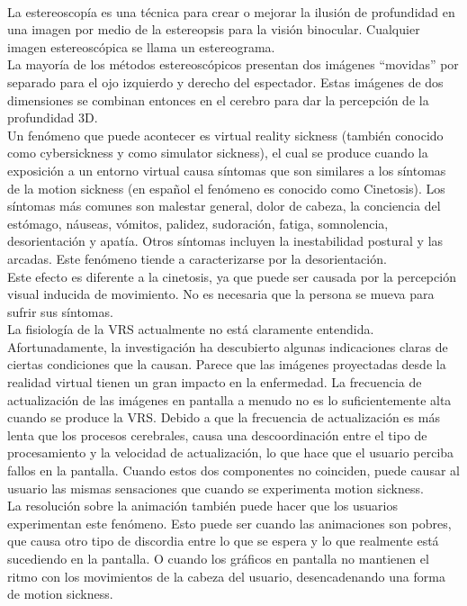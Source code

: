 \documentclass[12pt]{article}
\begin{document}
\\La estereoscopía es una técnica para crear o mejorar la ilusión de profundidad en una imagen por medio de la estereopsis para la visión binocular. Cualquier imagen estereoscópica se llama un estereograma. 
\\La mayoría de los métodos estereoscópicos presentan  dos imágenes “movidas” por separado para el ojo izquierdo y derecho del espectador. Estas imágenes de dos dimensiones se combinan entonces en el cerebro para dar la percepción de la profundidad 3D.
\\Un fenómeno que puede acontecer es virtual reality sickness (también conocido como cybersickness y como simulator sickness), el cual se produce cuando la exposición a un entorno virtual causa síntomas que son similares a los síntomas de la motion sickness\cite{VRS} (en español el fenómeno es conocido como Cinetosis). Los síntomas más comunes son malestar general, dolor de cabeza, la conciencia del estómago, náuseas, vómitos, palidez, sudoración, fatiga, somnolencia, desorientación y apatía. Otros síntomas incluyen la inestabilidad postural y las arcadas. Este fenómeno tiende a caracterizarse por la desorientación.
\\Este efecto es diferente a la cinetosis, ya que puede ser causada por la percepción visual inducida de movimiento. No es necesaria que la persona se mueva para sufrir sus síntomas.
\\La fisiología de la VRS actualmente no está claramente entendida. Afortunadamente, la investigación ha descubierto algunas indicaciones claras de ciertas condiciones que la causan. Parece que las imágenes proyectadas desde la realidad virtual tienen un gran impacto en la enfermedad. La frecuencia de actualización de las imágenes en pantalla a menudo no es lo suficientemente alta cuando se produce la VRS. Debido a que la frecuencia de actualización es más lenta que los procesos cerebrales, causa una descoordinación entre el tipo de procesamiento y la velocidad de actualización, lo que hace que el usuario perciba fallos en la pantalla. Cuando estos dos componentes no coinciden, puede causar al usuario las mismas sensaciones que cuando se experimenta motion sickness.
\\La resolución sobre la animación también puede hacer que los usuarios experimentan este fenómeno\cite{oculussickness}. Esto puede ser cuando las animaciones son pobres, que  causa otro tipo de discordia entre lo que se espera y lo que realmente está sucediendo en la pantalla. O cuando los gráficos en pantalla no mantienen el ritmo con los movimientos de la cabeza del usuario, desencadenando una forma de motion sickness.
\end{document}
